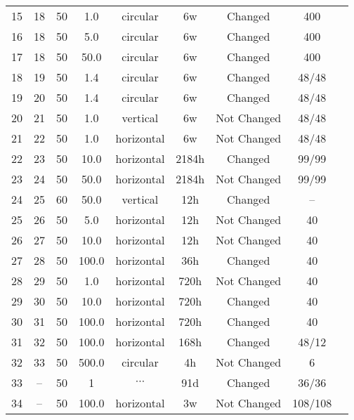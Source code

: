 \begin{tabular}{ccccccccc}
15& 18 & 50 & 1.0 & circular & 6w & Changed  & 400 & \citet{Kato1993} \\
16& 18 & 50 & 5.0 & circular & 6w & Changed  & 400 &  \citet{Kato1993} \\
17& 18 & 50 & 50.0 & circular & 6w & Changed  & 400 & \citet{Kato1993} \\
18& 19 & 50 & 1.4 & circular & 6w & Changed  & 48/48 & \citet{Kato1994a} \\
19& 20 & 50 & 1.4 & circular & 6w & Changed  & 48/48 & \citet{Kato1994b} \\
20& 21 & 50 & 1.0 & vertical & 6w & Not Changed  &48/48 &  \citet{Kato1994c} \\
21& 22 & 50 & 1.0 & horizontal & 6w & Not Changed  & 48/48 &  \citet{Kato1994c} \\
22& 23 & 50 & 10.0 & horizontal & 2184h & Changed  & 99/99 & \citet{Mevissen1996a} \\	
23& 24 & 50 & 50.0 & horizontal & 2184h & Not Changed  & 99/99 &\citet{Mevissen1996b} \\
24& 25 & 60 & 50.0 & vertical & 12h & Changed  & -- & \citet{Rosen1998} \\  
25& 26 & 50 & 5.0 & horizontal & 12h & Not Changed  &  40 &\citet{Selmaoui1995} \\
26& 27 & 50 & 10.0 & horizontal & 12h & Not Changed  & 40 & \citet{Selmaoui1995} \\
27& 28 & 50 & 100.0 & horizontal & 36h & Changed  &  40 &\citet{Selmaoui1995} \\
28& 29 & 50 & 1.0 & horizontal & 720h & Not Changed  & 40 & \citet{Selmaoui1995} \\
29& 30 & 50 & 10.0 & horizontal & 720h & Changed  &  40 &\citet{Selmaoui1995} \\
30& 31 & 50 & 100.0 & horizontal & 720h & Changed  & 40 & \citet{Selmaoui1995} \\
31& 32 & 50 & 100.0 & horizontal & 168h & Changed  & 48/12 & \citet{Selmaoui1999} \\
32& 33 & 50 & 500.0 & circular & 4h & Not Changed  & 6 & \citet{Tripp2003} \\
\hline
33& -- & 50 & 1 & $\cdots$ &  91d & Changed       & 36/36 & \citet{Loscher1994}\\ 
34& -- & 50 & 100.0 & horizontal & 3w  & Not Changed & 108/108 &\citet{Loscher1998} \\
\hline
\end{tabular}
